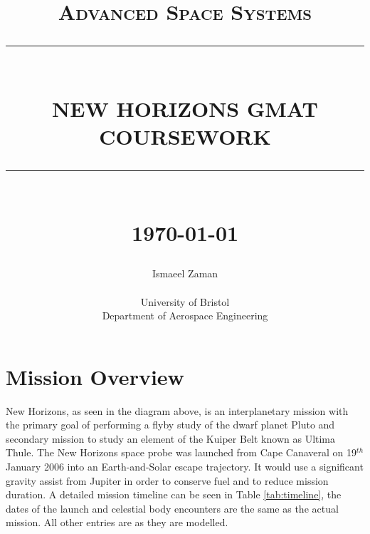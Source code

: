 \documentclass[11pt]{article}
\newcommand{\HRule}[1]{\rule{\linewidth}{#1}}
\begin{document}
\title{ \normalsize \textsc{Advanced Space Systems}
		\\ [2.0cm]
		\HRule{0.5pt} \\
		\LARGE \textbf{\uppercase{New Horizons GMAT Coursework}}
		\HRule{2pt} \\ [0.5cm]
		\normalsize \today \vspace*{5\baselineskip}}

\date{}


\author{
		Ismaeel Zaman  \\ 
		\\
		University of Bristol \\
		Department of Aerospace Engineering }

\maketitle
\thispagestyle{empty}
\newpage
\setcounter{page}{1}




\newpage

\section{Mission Overview}


New Horizons, as seen in the diagram above, is an interplanetary mission with the primary goal of performing a flyby study of the dwarf planet Pluto and secondary mission to study an element of the Kuiper Belt known as Ultima Thule.
The New Horizons space probe was launched from Cape Canaveral on 19$^{th}$ January 2006 into an Earth-and-Solar escape trajectory. It would use a significant gravity assist from Jupiter in order to conserve fuel and to reduce mission duration.
A detailed mission timeline can be seen in Table \ref{tab:timeline}, the dates of the launch and celestial body encounters are the same as the actual mission. All other entries are as they are modelled.
\end{document}
